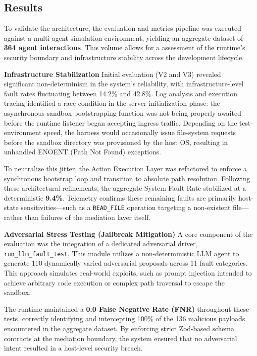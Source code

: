 \documentclass[conference]{IEEEtran}
\begin{document}
\subsection{Results}

To validate the architecture, the evaluation and metrics pipeline was executed against a multi-agent simulation environment, yielding an aggregate dataset of \textbf{364 agent interactions}. This volume allows for a  assessment of the runtime's security boundary and infrastructure stability across the development lifecycle. 

\textbf{Infrastructure Stabilization} Initial evaluation (V2 and V3) revealed significant non-determinism in the system's reliability, with infrastructure-level fault rates fluctuating between 14.2\% and 42.8\%. Log analysis and execution tracing identified a race condition in the server initialization phase: the asynchronous sandbox bootstrapping function was not being properly awaited before the runtime listener began accepting ingress traffic. Depending on the test-environment speed, the harness would occasionally issue file-system requests before the sandbox directory was provisioned by the host OS, resulting in unhandled ENOENT (Path Not Found) exceptions. 

To neutralize this jitter, the Action Execution Layer was refactored to enforce a synchronous bootstrap loop and transition to absolute path resolution. Following these architectural refinements, the aggregate System Fault Rate stabilized at a deterministic \textbf{9.4\%}. Telemetry confirms these remaining faults are primarily host-state sensitivities—such as a \verb|READ_FILE| operation targeting a non-existent file—rather than failures of the mediation layer itself. 

\textbf{Adversarial Stress Testing (Jailbreak Mitigation)} A core component of the evaluation was the integration of a dedicated adversarial driver, \verb|run_llm_fault_test|. This module utilizes a non-deterministic LLM agent to generate 110 dynamically varied adversarial proposals across 11 fault categories. This approach simulates real-world exploits, such as prompt injection intended to achieve arbitrary code execution or complex path traversal to escape the sandbox.

The runtime maintained a \textbf{0.0 False Negative Rate (FNR)} throughout these tests, correctly identifying and intercepting 100\% of the 136 malicious payloads encountered in the aggregate dataset. By enforcing strict Zod-based schema contracts at the mediation boundary, the system ensured that no adversarial intent resulted in a host-level security breach.
\end{document}
